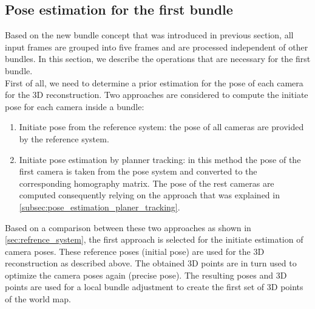 \subsection{Pose estimation for the first bundle}\label{subsec:pose_first_bundle}

Based on the new bundle concept that was introduced in previous section, all input frames are grouped into five frames and are processed independent of other bundles. In this section, we describe the operations that are necessary for the first bundle.\\
First of all, we need to determine a prior estimation for the pose of each camera for the 3D reconstruction. Two approaches are considered to compute the initiate pose for each camera inside a bundle:
\begin{enumerate}
\item Initiate pose from the reference system: the pose of all cameras are provided by the reference system.
\item Initiate pose estimation by planner tracking: in this method the pose of the first camera is taken from the pose system and converted to the corresponding homography matrix. The pose of the rest cameras are computed consequently relying on the approach that was explained in \autoref{subsec:pose_estimation_planer_tracking}.
\end{enumerate}
Based on a comparison between these two approaches as shown in \autoref{sec:refrence_system}, the first approach is selected for the initiate estimation of camera poses. These reference poses (initial pose) are used for the 3D reconstruction as described above. The obtained 3D points are in turn used to optimize the camera poses again (precise pose). The resulting poses and 3D points are used for a local bundle adjustment to create the first set of 3D points of the world map. 



